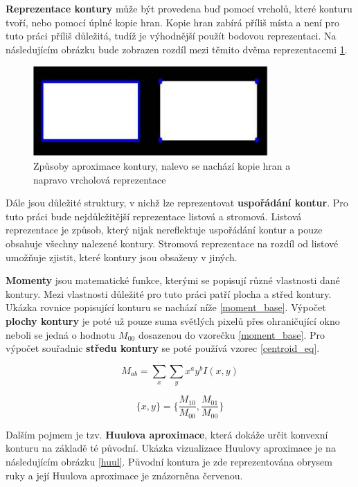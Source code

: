 \textbf{Reprezentace kontury} může být provedena buď pomocí vrcholů, které konturu tvoří, nebo pomocí úplné kopie hran. Kopie hran zabírá příliš místa a není pro tuto práci příliš důležitá, tudíž je výhodnější použít bodovou reprezentaci. Na následujícím obrázku bude zobrazen rozdíl mezi těmito dvěma reprezentacemi \ref{body_kontury}.

\begin{figure}[h]
	\centering
	\includegraphics[width=0.8\textwidth]{obrazky/body_kontury.png}
	\caption{Způsoby aproximace kontury, nalevo se nachází kopie hran a napravo vrcholová reprezentace \cite{opencv_doc}}
	\label{body_kontury}
\end{figure}

\newpage
Dále jsou důležité struktury, v nichž lze reprezentovat \textbf{uspořádání kontur}. Pro tuto práci bude nejdůležitější reprezentace listová a stromová. Listová reprezentace je způsob, který nijak nereflektuje uspořádání kontur a pouze obsahuje všechny nalezené kontury. Stromová reprezentace na rozdíl od listové umožňuje zjistit, které kontury jsou obsaženy v jiných.

\textbf{Momenty} jsou matematické funkce, kterými se popisují různé vlastnosti dané kontury. Mezi vlastnosti důležité pro tuto práci patří plocha a střed kontury. Ukázka rovnice popisující konturu se nachází níže \ref{moment_base}.
Výpočet \textbf{plochy kontury} je poté už pouze suma světlých pixelů přes ohraničující okno neboli se jedná o hodnotu $M_{00}$ dosazenou do vzorečku \ref{moment_base}. 
Pro výpočet souřadnic \textbf{středu kontury} se poté používá vzorec \ref{centroid_eq}.

\begin{equation}
    M_{ab} =  \sum_{x} \sum_{y} x^a y^b I(x,y)
    \label{moment_base}
\end{equation}


\begin{equation}
    \{x,y\} =  \{\frac{M_{10}}{M_{00}}, \frac{M_{01}}{M_{00}}\}
    \label{centroid_eq}
\end{equation}

Dalším pojmem je tzv. \textbf{Huulova aproximace}, která dokáže určit konvexní konturu na základě té původní. Ukázka vizualizace Huulovy aproximace je na následujícím obrázku \ref{huul}. Původní kontura je zde reprezentována obrysem ruky a její Huulova aproximace je znázorněna červenou. 

